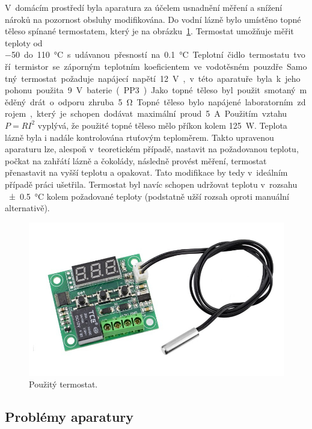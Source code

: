 \documentclass[12pt]{article}
\begin{document}
\par\noindent
V~domácím prostředí byla aparatura za účelem usnadnění měření a snížení nároků na pozornost obsluhy modifikována. Do vodní lázně bylo umístěno topné těleso spínané termostatem, který je na obrázku~\ref{fig:termostat}. Termostat umožňuje měřit teploty od \SI{-50} do \SI{110}{\degreeCelsius} s~udávanou přesností na \SI{0,1}{\degreeCelsius}. Teplotní čidlo termostatu tvoří termistor se záporným teplotním koeficientem ve vodotěsném pouzdře. Samotný termostat požaduje napájecí napětí \SI{12}{\volt}, v~této aparatuře byla k~jeho pohonu použita \SI{9}{\volt} baterie (PP3). Jako topné těleso byl použit smotaný měděný drát o odporu zhruba \SI{5}{\ohm}. Topné těleso bylo napájené laboratorním zdrojem, který je schopen dodávat maximální proud \SI{5}{\ampere}. Použitím vztahu $P=RI^2$ vyplývá, že použité topné těleso mělo příkon kolem \SI{125}{\watt}. Teplota lázně byla i nadále kontrolována rtuťovým teploměrem. Takto upravenou aparaturu lze, alespoň v~teoretickém případě, nastavit na požadovanou teplotu, počkat na zahřátí lázně a čokolády, následně provést měření, termostat přenastavit na vyšší teplotu a opakovat. Tato modifikace by tedy v~ideálním případě práci ušetřila. Termostat byl navíc schopen udržovat teplotu v~rozsahu \SI{\pm 0,5}{\degreeCelsius} kolem požadované teploty (podstatně užší rozsah oproti manuální alternativě).

\begin{figure}
    \centering
    \includegraphics[width = 0.5\linewidth]{figures/termostat.jpg}
    \caption{Použitý termostat.~\cite{Figure:termostat}}
    \label{fig:termostat}
\end{figure}

\subsection{Problémy aparatury}%
\end{document}
